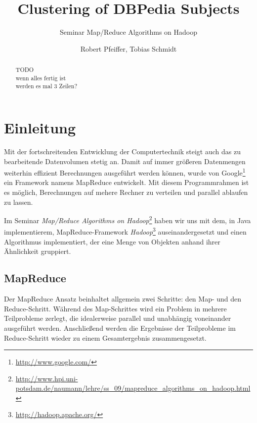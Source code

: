 \documentclass[a4paper]{llncs}
\begin{document}
\title{Clustering of DBPedia Subjects}
\subtitle{Seminar Map/Reduce Algorithms on Hadoop}
\author{Robert Pfeiffer, Tobias Schmidt}

\maketitle

\begin{abstract}
TODO\\
wenn alles fertig ist\\
werden es mal 3 Zeilen?
\end{abstract}

\section{Einleitung}
Mit der fortschreitenden Entwicklung der Computertechnik steigt auch das zu bearbeitende Datenvolumen stetig an. Damit auf immer größeren Datenmengen weiterhin effizient Berechnungen ausgeführt werden können, wurde von Google\footnote{\url{http://www.google.com/}} ein Framework namens MapReduce entwickelt. Mit diesem Programmrahmen ist es möglich, Berechnungen auf mehere Rechner zu verteilen und parallel ablaufen zu lassen.

Im Seminar \emph{Map/Reduce Algorithms on Hadoop}\footnote{\url{http://www.hpi.uni-potsdam.de/naumann/lehre/ss_09/mapreduce_algorithms_on_hadoop.html}} haben wir uns mit dem, in Java implementierem, MapReduce-Framework \emph{Hadoop}\footnote{\url{http://hadoop.apache.org/}} auseinandergesetzt und einen Algorithmus implementiert, der eine Menge von Objekten anhand ihrer Ähnlichkeit gruppiert.

\subsection{MapReduce}
Der MapReduce Ansatz beinhaltet allgemein zwei Schritte: den Map- und den Reduce-Schritt. Während des Map-Schrittes wird ein Problem in mehrere Teilprobleme zerlegt, die idealerweise parallel und unabhängig voneinander ausgeführt werden. Anschließend werden die Ergebnisse der Teilprobleme im Reduce-Schritt wieder zu einem Gesamtergebnis zusammengesetzt.
\end{document}
